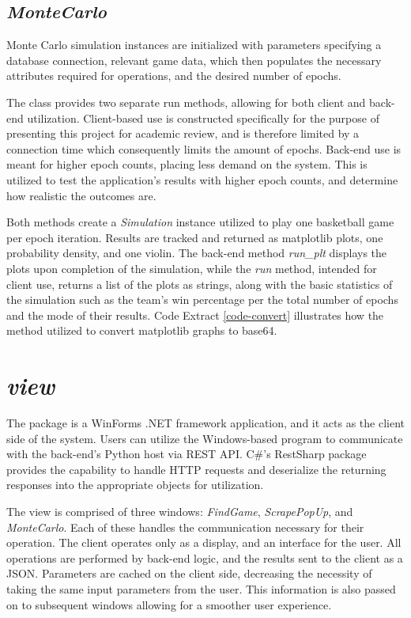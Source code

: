 \documentclass{thesis-ekf}
\theoremstyle{definition}
\theoremstyle{remark}
\begin{document}
\subsection{\emph{MonteCarlo}}
Monte Carlo simulation instances are initialized with parameters specifying a database connection, relevant game data, which then populates the necessary attributes required for operations, and the desired number of epochs.

The class provides two separate run methods, allowing for both client and back-end utilization. Client-based use is constructed specifically for the purpose of presenting this project for academic review, and is therefore limited by a connection time which consequently limits the amount of epochs. Back-end use is meant for higher epoch counts, placing less demand on the system. This is utilized to test the application's results with higher epoch counts, and determine how realistic the outcomes are.

Both methods create a \emph{Simulation} instance utilized to play one basketball game per epoch iteration. Results are tracked and returned as matplotlib plots, one probability density, and one violin. The back-end method \emph{run\_plt} displays the plots upon completion of the simulation, while the \emph{run} method, intended for client use, returns a list of the plots as strings, along with the basic statistics of the simulation such as the team's win percentage per the total number of epochs and the mode of their results. Code Extract \ref{code-convert} illustrates how the method utilized to convert matplotlib graphs to base64.



\section{\emph{view}}
The package is a WinForms .NET framework application, and it acts as the client side of the system. Users can utilize the Windows-based program to communicate with the back-end's Python host via REST API. C\#'s RestSharp package provides the capability to handle HTTP requests and deserialize the returning responses into the appropriate objects for utilization.

The view is comprised of three windows: \emph{FindGame}, \emph{ScrapePopUp}, and \emph{MonteCarlo}. Each of these handles the communication necessary for their operation. The client operates only as a display, and an interface for the user. All operations are performed by back-end logic, and the results sent to the client as a JSON. Parameters are cached on the client side, decreasing the necessity of taking the same input parameters from the user. This information is also passed on to subsequent windows allowing for a smoother user experience.
\end{document}
